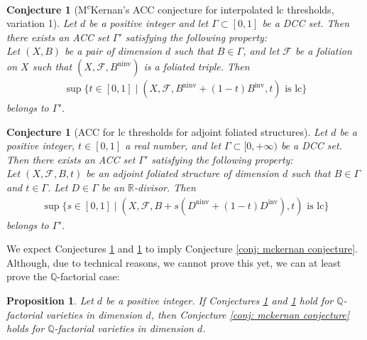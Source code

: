 \documentclass[12pt]{amsart}
\numberwithin{equation}{section}
\newcommand{\Qq}{\mathbb{Q}}
\newcommand{\Rr}{\mathbb{R}}
\newcommand{\ninv}{\operatorname{ninv}}
\newcommand{\inv}{\operatorname{inv}}
\newcommand{\Ff}{\mathcal{F}}
\newcommand{\Ii}{\Gamma}
\newtheorem{conj}[thm]{Conjecture}
\newtheorem{prop}[thm]{Proposition}
\theoremstyle{definition}
\theoremstyle{definition}
\theoremstyle{definition}
\begin{document}
\begin{conj}[M\textsuperscript{c}Kernan's ACC conjecture for interpolated lc thresholds, variation 1]\label{conj: strong mckernan conjecture}
 Let $d$ be a positive integer and let 
 $\Ii\subset [0,1]$ 
 be a DCC set. 
 Then there exists an ACC set $\Ii'$ satisfying the following property:
 \\
 Let $(X,B)$ be a pair of dimension $d$ such that $B\in\Ii$, and let $\Ff$ be a foliation on $X$ such that $(X,\Ff,B^{\ninv})$ is a foliated triple. Then
\begin{align*}
\sup\{t\in [0,1]\mid (X,\Ff,B^{\ninv}+(1-t)B^{\inv},t)\text{ is lc}\}
\end{align*}
belongs to $\Ii'$.
\end{conj}

\begin{conj}[ACC for lc thresholds for adjoint foliated structures]\label{conj: acc for lct afs}
 Let $d$ be a positive integer, $t\in [0,1]$ a real number, and let $\Ii\subset [0,+\infty)$ be a DCC set. 
 Then there exists an ACC set $\Ii'$ satisfying the following property:
 \\
 Let $(X,\Ff,B,t)$ be an adjoint foliated structure of dimension $d$ such that $B\in\Ii$ and $t\in\Ii$. Let $D\in\Ii$ be an $\Rr$-divisor. Then
\begin{align*}
\sup\{s\in [0,1]\mid (X,\Ff,B+s(D^{\ninv}+(1-t)D^{\inv}),t)\text{ is lc}\}
\end{align*}
belongs to $\Ii'$.
\end{conj}

We expect Conjectures \ref{conj: strong mckernan conjecture} and \ref{conj: acc for lct afs} to imply Conjecture \ref{conj: mckernan conjecture}. Although, due to technical reasons, we cannot prove this yet, we can at least prove the $\Qq$-factorial case:

\begin{prop}
Let $d$ be a positive integer. If Conjectures \ref{conj: strong mckernan conjecture} and \ref{conj: acc for lct afs} hold for $\Qq$-factorial varieties in dimension $d$, then Conjecture \ref{conj: mckernan conjecture} holds for $\Qq$-factorial varieties in dimension $d$.
\end{prop}
\end{document}
